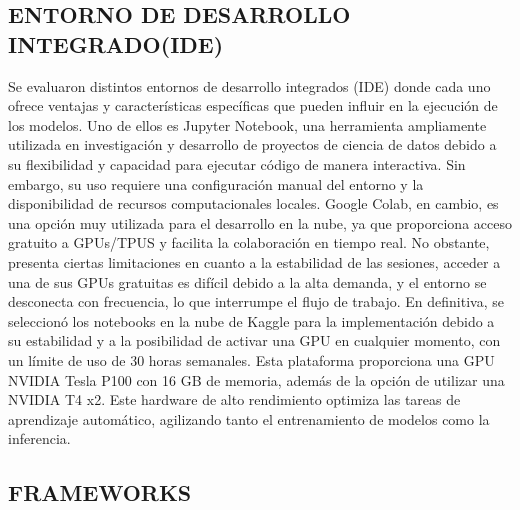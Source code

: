 \subsection{ENTORNO DE DESARROLLO INTEGRADO(IDE)}

Se evaluaron distintos entornos de desarrollo integrados (IDE) donde cada uno ofrece
ventajas y características específicas que pueden influir en la ejecución de los modelos.
Uno de ellos es Jupyter Notebook, una herramienta ampliamente utilizada en investigación y
desarrollo de proyectos de ciencia de datos debido a su flexibilidad y capacidad para
ejecutar código de manera interactiva. Sin embargo, su uso requiere una configuración
manual del entorno y la disponibilidad de recursos computacionales locales. Google Colab,
en cambio, es una opción muy utilizada para el desarrollo en la nube, ya que proporciona
acceso gratuito a GPUs/TPUS y facilita la colaboración en tiempo real. No obstante,
presenta ciertas limitaciones en cuanto a la estabilidad de las sesiones, acceder a una de
sus GPUs gratuitas es difícil debido a la alta demanda, y el entorno se desconecta con
frecuencia, lo que interrumpe el flujo de trabajo. En definitiva, se seleccionó los
notebooks en la nube de Kaggle para la implementación debido a su estabilidad y a la
posibilidad de activar una GPU en cualquier momento, con un límite de uso de 30 horas
semanales. Esta plataforma proporciona una GPU NVIDIA Tesla P100 con 16 GB de memoria,
además de la opción de utilizar una NVIDIA T4 x2. Este hardware de alto rendimiento
optimiza las tareas de aprendizaje automático, agilizando tanto el entrenamiento de
modelos como la inferencia.

\subsection{FRAMEWORKS}

